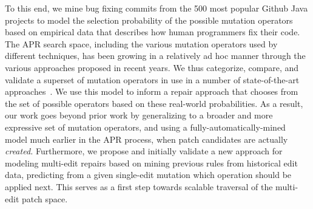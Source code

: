 \documentclass[conference]{IEEEtran}
\begin{document}
To this end, we mine bug fixing commits from 
the 500 most popular Github Java projects to model the selection probability of
the possible mutation operators based on 
empirical data that describes how human programmers fix their code.  
The APR search space, including the various mutation
operators used by different techniques, has been growing in a relatively ad hoc 
manner through the various approaches proposed in recent years. We thus
categorize, compare, and validate a superset of
mutation operators in use in a number of 
state-of-the-art approaches~\cite{legoues12,Weimer13,kim2013,long16proph}.
We use this model to inform a repair approach that chooses from the set of possible
operators based on these real-world probabilities.
As a result, our work goes beyond prior work  by generalizing
to a broader and more expressive set of
mutation operators, and using a fully-automatically-mined model much 
earlier in the APR process, when patch candidates are actually \emph{created.}
Furthermore, we propose and initially validate a new approach for modeling
multi-edit repairs based on mining previous rules from historical edit data, 
predicting from a given 
single-edit mutation which operation should be applied
next.  This serves  as a first step towards
scalable traversal of the multi-edit patch space. 
\end{document}

